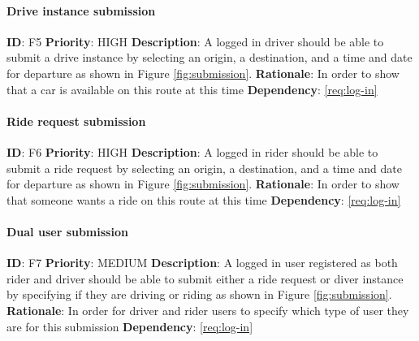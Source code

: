 \documentclass{article}
\begin{document}
\paragraph{Drive instance submission}\label{req:driveInstance}
\textbf{ID}: F5\newline
\textbf{Priority}: HIGH\newline
\textbf{Description}: A logged in driver should be able to submit a drive instance by selecting an origin, a destination, and a time and date for departure as shown in Figure \ref{fig:submission}. \newline
\textbf{Rationale}: In order to show that a car is available on this route at this time\newline
\textbf{Dependency}: \ref{req:log-in}\newline

\paragraph{Ride request submission}\label{req:rideRequest}
\textbf{ID}: F6\newline
\textbf{Priority}: HIGH\newline
\textbf{Description}: A logged in rider should be able to submit a ride request by selecting an origin, a destination, and a time and date for departure as shown in Figure \ref{fig:submission}. \newline
\textbf{Rationale}: In order to show that someone wants a ride on this route at this time\newline
\textbf{Dependency}: \ref{req:log-in}\newline

\paragraph{Dual user submission}\label{req:dualSubmission}
\textbf{ID}: F7\newline
\textbf{Priority}: MEDIUM\newline
\textbf{Description}: A logged in user registered as both rider and driver should be able to submit either a ride request or diver instance by specifying if they are driving or riding as shown in Figure \ref{fig:submission}. \newline
\textbf{Rationale}: In order for driver and rider users to specify which type of user they are for this submission\newline
\textbf{Dependency}: \ref{req:log-in}\newline
\end{document}
